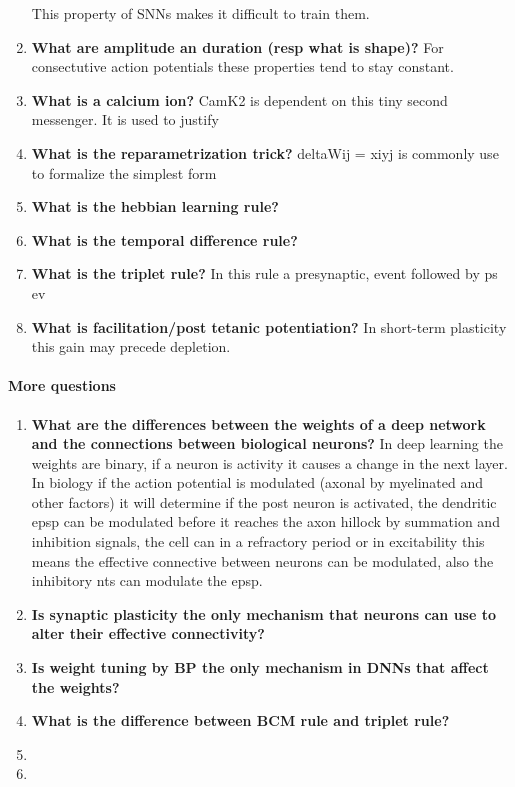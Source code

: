 \documentclass[main]{subfiles}
\begin{document}
\begin{enumerate}
    This property of SNNs makes it difficult to train them.
    \item \textbf{What are amplitude an duration (resp what is shape)?}
    For consectutive action potentials these properties tend to stay constant.
    \item \textbf{What is a calcium ion?}
    CamK2 is dependent on this tiny second messenger.
    It is used to justify
    \item \textbf{What is the reparametrization trick?}
    deltaWij = xiyj is commonly use to formalize the simplest form
    \item \textbf{What is the hebbian learning rule?}
    \item \textbf{What is the temporal difference rule?}
    \item \textbf{What is the triplet rule?}
    In this rule a presynaptic, event followed by ps ev
    \item \textbf{What is facilitation/post tetanic potentiation?}
    In short-term plasticity this gain may precede depletion.
\end{enumerate}

\paragraph{More questions}
\begin{enumerate}
    \item \textbf{What are the differences between the weights of a deep network and the connections between biological neurons?} 
    In deep learning the weights are binary, if a neuron is activity it causes a change in the next layer.
    In biology if the action potential is modulated (axonal by myelinated and other factors) it will determine if the post neuron is activated, the dendritic epsp can be modulated before it reaches the axon hillock by summation and inhibition signals, the cell can in a refractory period or in excitability this means the effective connective between neurons can be modulated, also the inhibitory nts can modulate the epsp.
    \item \textbf{Is synaptic plasticity the only mechanism that neurons can use to alter their effective connectivity?}
    \item \textbf{Is weight tuning by BP the only mechanism in DNNs that affect the weights?}
    \item \textbf{What is the difference between BCM rule and triplet rule?}
    \item
    \item
\end{enumerate}
\end{document}
